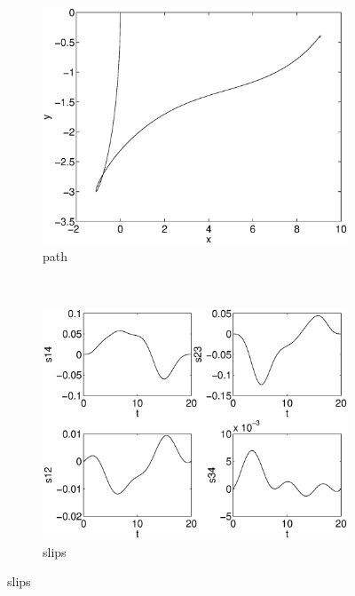 \begin{figure}
\begin{subfigure}[b]{0.45\textwidth}
\centering
\includegraphics[width=\textwidth]{img/manip_task_path.eps}
\caption{path}
\end{subfigure}
~
\begin{subfigure}[b]{0.45\textwidth}
\centering
\includegraphics[width=\textwidth]{img/manip_task_slips.eps}
\caption{slips}
\end{subfigure}


\end{figure}
